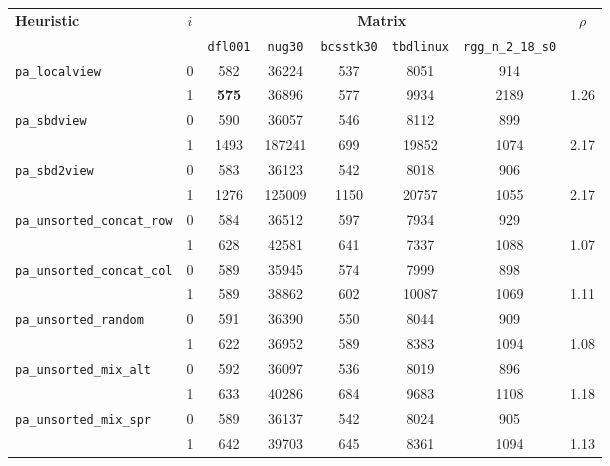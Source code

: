 \begin{table}[H]
	\centering
	\renewcommand{\arraystretch}{1.15}
	\begin{tabular}{|l|c||c|c|c|c|c||c|}
		\hline
		\multirow{2}{*}{\textbf{Heuristic}} & \multirow{2}{*}{$i$} &  \multicolumn{5}{|c||}{\textbf{Matrix}} & \multirow{2}{*}{$\rho$} \\ \cline{3-7}
		& & \texttt{dfl001} & \texttt{nug30} & \texttt{bcsstk30} & \texttt{tbdlinux} & \texttt{rgg\_n\_2\_18\_s0} & \\ \hline
		\verb|pa_localview| & 0 & 582 & 36224 & 537 & 8051 & 914 &   \\ %
		& 1 & \textbf{575} & 36896 & 577 & 9934 & 2189 & 1.26 \\ \hline %

		\verb|pa_sbdview| & 0 & 590 & 36057 & 546 & 8112 & 899 & \\ %
		& 1 & 1493 & 187241 & 699 & 19852 & 1074 & 2.17 \\ \hline %

		\verb|pa_sbd2view| & 0 & 583 &  36123 & 542 & 8018 & 906 &  \\ %
		& 1 & 1276 & 125009 & 1150 & 20757 & 1055 & 2.17 \\ \hline %

		\verb|pa_unsorted_concat_row| & 0 & 584 & 36512 & 597 & 7934 & 929 & \\ %
		& 1 & 628 & 42581 & 641 & 7337 & 1088 & 1.07 \\\hline %

		\verb|pa_unsorted_concat_col| & 0 & 589 & 35945 & 574 & 7999 & 898 & \\ %
		& 1 & 589 & 38862 & 602 & 10087 & 1069 & 1.11 \\\hline %

		\verb|pa_unsorted_random| & 0 & 591 & 36390 & 550 & 8044 & 909 & \\ %
		& 1 & 622 & 36952 & 589 & 8383 & 1094 & 1.08 \\ \hline %

		\verb|pa_unsorted_mix_alt| & 0 & 592 & 36097 & 536 & 8019 & 896 & \\ %
		& 1 &  633 & 40286 & 684 & 9683 & 1108 & 1.18 \\ \hline %

		\verb|pa_unsorted_mix_spr| & 0 & 589 & 36137 & 542 & 8024 & 905 & \\ %
		& 1 &  642 & 39703 & 645 & 8361 & 1094 & 1.13 \\ \hline %


\end{tabular}
\end{table}
